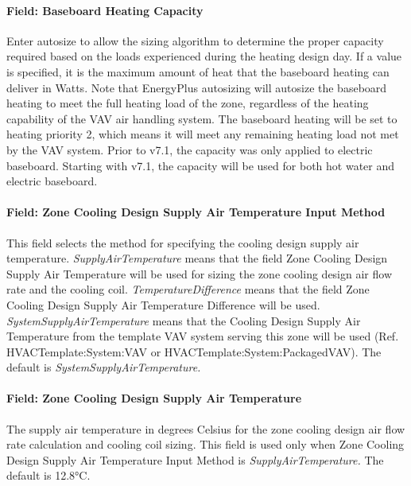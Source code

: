 \paragraph{Field: Baseboard Heating Capacity}\label{field-baseboard-heating-capacity-9}

Enter autosize to allow the sizing algorithm to determine the proper capacity required based on the loads experienced during the heating design day. If a value is specified, it is the maximum amount of heat that the baseboard heating can deliver in Watts. Note that EnergyPlus autosizing will autosize the baseboard heating to meet the full heating load of the zone, regardless of the heating capability of the VAV air handling system. The baseboard heating will be set to heating priority 2, which means it will meet any remaining heating load not met by the VAV system. Prior to v7.1, the capacity was only applied to electric baseboard. Starting with v7.1, the capacity will be used for both hot water and electric baseboard.

\paragraph{Field: Zone Cooling Design Supply Air Temperature Input Method}\label{field-zone-cooling-design-supply-air-temperature-input-method-8}

This field selects the method for specifying the cooling design supply air temperature. \emph{SupplyAirTemperature} means that the field Zone Cooling Design Supply Air Temperature will be used for sizing the zone cooling design air flow rate and the cooling coil. \emph{TemperatureDifference} means that the field Zone Cooling Design Supply Air Temperature Difference will be used. \emph{SystemSupplyAirTemperature} means that the Cooling Design Supply Air Temperature from the template VAV system serving this zone will be used (Ref. HVACTemplate:System:VAV or HVACTemplate:System:PackagedVAV). The default is \emph{SystemSupplyAirTemperature.}

\paragraph{Field: Zone Cooling Design Supply Air Temperature}\label{field-zone-cooling-design-supply-air-temperature-7}

The supply air temperature in degrees Celsius for the zone cooling design air flow rate calculation and cooling coil sizing. This field is used only when Zone Cooling Design Supply Air Temperature Input Method is \emph{SupplyAirTemperature.} The default is 12.8°C.

